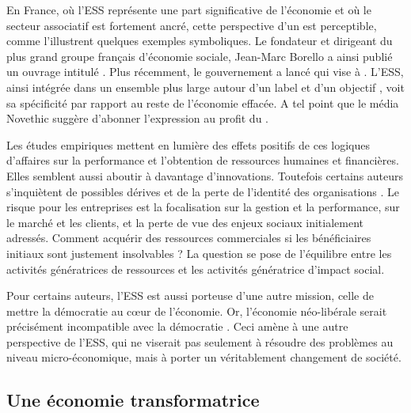             En France, où l’ESS représente une part significative de l’économie et où le secteur associatif est fortement ancré, cette perspective d’un  est perceptible, comme l’illustrent quelques exemples symboliques. Le fondateur et dirigeant du plus grand groupe français d’économie sociale, Jean-Marc Borello a ainsi publié un ouvrage intitulé . Plus récemment, le gouvernement a lancé  qui vise à  \parencite{ministere_de_leducation_nationale2018lancement}. L’ESS, ainsi intégrée dans un ensemble plus large autour d’un label et d’un objectif , voit sa spécificité par rapport au reste de l’économie effacée. A tel point que le média Novethic suggère d’abonner l’expression  au profit du  \parencite{alvarez2018ne}.

            Les études empiriques mettent en lumière des effets positifs de ces logiques d’affaires sur la performance et l’obtention de ressources humaines et financières. Elles semblent aussi aboutir à davantage d’innovations. Toutefois certains auteurs s’inquiètent de possibles dérives \parencite{maier2016nonprofit} et de la perte de l’identité des organisations \parencite[p. 134]{laville2016economie}. Le risque pour les entreprises est la focalisation sur la gestion et la performance, sur le marché et les clients, et la perte de vue des enjeux sociaux initialement adressés. Comment acquérir des ressources commerciales si les bénéficiaires initiaux sont justement insolvables ? La question se pose de l’équilibre entre les activités génératrices de ressources et les activités génératrice d’impact social.

            Pour certains auteurs, l’ESS est aussi porteuse d’une autre mission, celle de mettre la démocratie au cœur de l’économie. Or, l’économie néo-libérale serait précisément incompatible avec la démocratie \parencite{defalvard2016leconomie}. Ceci amène à une autre perspective de l’ESS, qui ne viserait pas seulement à résoudre des problèmes au niveau micro-économique, mais à porter un véritablement changement de société.

        \subsection{Une économie transformatrice }

